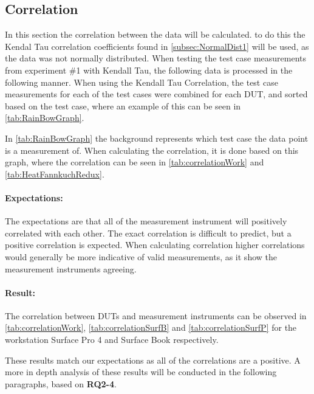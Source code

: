 \subsection{Correlation}\label{subsec:correlation1}

In this section the correlation between the data will be calculated. to do this the Kendal Tau correlation coefficients found in \cref{subsec:NormalDist1} will be used, as the data was not normally distributed. When testing the test case measurements from experiment \#1 with Kendall Tau, the following data is processed in the following manner. When using the Kendall Tau Correlation, the test case measurements for each of the test cases were combined for each DUT, and sorted based on the test case, where an example of this can be seen in \cref{tab:RainBowGraph}.



In \cref{tab:RainBowGraph} the background represents which test case the data point is a measurement of. When calculating the correlation, it is done based on this graph, where the correlation can be seen in \cref{tab:correlationWork} and \cref{tab:HeatFannkuchRedux}.

\paragraph{Expectations:} The expectations are that all of the measurement instrument will positively correlated with each other. The exact correlation is difficult to predict, but a positive correlation is expected. When calculating correlation higher correlations would generally be more indicative of valid measurements, as it show the measurement instruments agreeing.

\paragraph{Result:} The correlation between DUTs and measurement instruments can be observed in \cref{tab:correlationWork},  \cref{tab:correlationSurfB} and \cref{tab:correlationSurfP} for the workstation Surface Pro 4 and Surface Book respectively.




These results match our expectations as all of the correlations are a positive. A more in depth analysis of these results will be conducted in the following paragraphs, based on \textbf{RQ2-4}.

